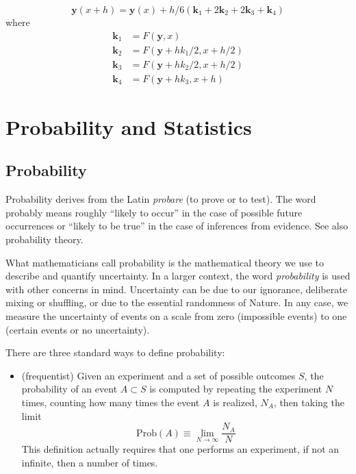 \documentclass[justified,sixbynine]{tufte-book}
\theoremstyle{plain}%
\theoremstyle{definition}
\theoremstyle{remark}
\begin{document}
\begin{fullwidth}
\begin{equation}
\mathbf{y}(x+h) = \mathbf{y}(x) + h/6 (\mathbf{k}_1+2\mathbf{k}_2+2\mathbf{k}_3+\mathbf{k}_4)\label{rungekutta}
\end{equation}
where
\begin{align}
\mathbf{k}_1 &= F(\mathbf{y},x) \\
\mathbf{k}_2 &= F(\mathbf{y}+h k_1/2,x+h/2) \\
\mathbf{k}_3 &= F(\mathbf{y}+h k_2/2,x+h/2) \\
\mathbf{k}_4 &= F(\mathbf{y}+h k_3,x+h)
\end{align}

\chapter{Probability and Statistics}

\goodbreak\section{Probability}


Probability derives from the Latin {\it probare} (to prove or to test). The word
probably means roughly ``likely to occur'' in the case of possible future
occurrences or ``likely to be true'' in the case of inferences from
evidence. See also probability theory.

What mathematicians call probability is the mathematical theory we use to
describe and quantify uncertainty. In a larger context, the word {\it probability}
is used with other concerns in mind. Uncertainty can be due to our
ignorance, deliberate mixing or shuffling, or due to the essential
randomness of Nature. In any case, we measure the uncertainty of events on a
scale from zero (impossible events) to one (certain events or no
uncertainty).

There are three standard ways to define probability:

\begin{itemize}
\item  (frequentist) Given an experiment and a set of possible outcomes $S$,
the probability of an event $A\subset S$ is computed by repeating the
experiment $N$ times, counting how many times the event $A$ is realized, $N_A
$, then taking the limit
\begin{equation}
\textrm{Prob}(A)\equiv \lim_{N\rightarrow \infty }\frac{N_A}N
\end{equation}
This definition actually requires that one performs an experiment,
if not an infinite, then a number of times.


\end{itemize}
\end{fullwidth}
\end{document}
